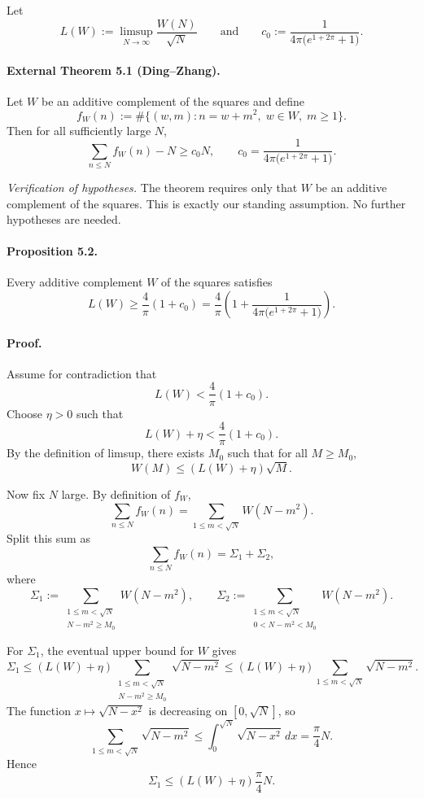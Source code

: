 Let
\[
L(W):=\limsup_{N\to\infty}\frac{W(N)}{\sqrt N}
\qquad\text{and}\qquad
c_0:=\frac{1}{4\pi\bigl(e^{1+2\pi}+1\bigr)}.
\]

\paragraph{External Theorem 5.1 (Ding--Zhang).}
Let \(W\) be an additive complement of the squares and define
\[
f_W(n):=\#\{(w,m):n=w+m^2,\; w\in W,\; m\ge 1\}.
\]
Then for all sufficiently large \(N\),
\[
\sum_{n\le N} f_W(n)-N\ge c_0 N,
\qquad c_0=\frac{1}{4\pi\bigl(e^{1+2\pi}+1\bigr)}.
\]

\emph{Verification of hypotheses.}
The theorem requires only that \(W\) be an additive complement of the squares. This is exactly our standing assumption. No further hypotheses are needed.

\paragraph{Proposition 5.2.}
Every additive complement \(W\) of the squares satisfies
\[
L(W)\ge \frac{4}{\pi}(1+c_0)
=\frac{4}{\pi}\left(1+\frac{1}{4\pi\bigl(e^{1+2\pi}+1\bigr)}\right).
\]

\paragraph{Proof.}
Assume for contradiction that
\[
L(W)<\frac{4}{\pi}(1+c_0).
\]
Choose \(\eta>0\) such that
\[
L(W)+\eta<\frac{4}{\pi}(1+c_0).
\]
By the definition of limsup, there exists \(M_0\) such that for all \(M\ge M_0\),
\[
W(M)\le (L(W)+\eta)\sqrt M.
\]

Now fix \(N\) large. By definition of \(f_W\),
\[
\sum_{n\le N} f_W(n)=\sum_{1\le m<\sqrt N} W(N-m^2).
\]
Split this sum as
\[
\sum_{n\le N} f_W(n)=\Sigma_1+\Sigma_2,
\]
where
\[
\Sigma_1:=\sum_{\substack{1\le m<\sqrt N\\ N-m^2\ge M_0}} W(N-m^2),
\qquad
\Sigma_2:=\sum_{\substack{1\le m<\sqrt N\\ 0< N-m^2< M_0}} W(N-m^2).
\]

For \(\Sigma_1\), the eventual upper bound for \(W\) gives
\[
\Sigma_1\le (L(W)+\eta)
\sum_{\substack{1\le m<\sqrt N\\ N-m^2\ge M_0}} \sqrt{N-m^2}
\le (L(W)+\eta)\sum_{1\le m<\sqrt N}\sqrt{N-m^2}.
\]
The function \(x\mapsto \sqrt{N-x^2}\) is decreasing on \([0,\sqrt N]\), so
\[
\sum_{1\le m<\sqrt N}\sqrt{N-m^2}
\le \int_0^{\sqrt N}\sqrt{N-x^2}\,dx
=\frac{\pi}{4}N.
\]
Hence
\[
\Sigma_1\le (L(W)+\eta)\frac{\pi}{4}N.
\]

